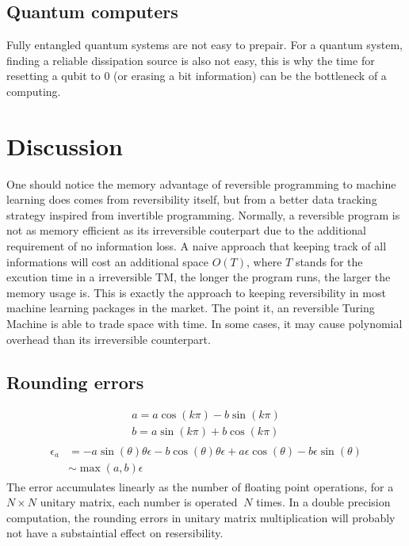 \documentclass{article}
\newcommand{\<}{\langle}
\renewcommand{\>}{\rangle}
\begin{document}
\subsection{Quantum computers}
Fully entangled quantum systems are not easy to prepair.
For a quantum system, finding a reliable dissipation source is also not easy,
this is why the time for resetting a qubit to $0$ (or erasing a bit information) can be the bottleneck of a computing.

\section{Discussion}
One should notice the memory advantage of reversible programming to machine learning does comes from reversibility itself, but from a better data tracking strategy inspired from invertible programming.
Normally, a reversible program is not as memory efficient as its irreversible couterpart due to the additional requirement of no information loss. A naive approach that keeping track of all informations will cost an additional space $O(T)$, where $T$ stands for the excution time in a irreversible TM, the longer the program runs, the larger the memory usage is. This is exactly the approach to keeping reversibility in most machine learning packages in the market.
The point it, an reversible Turing Machine is able to trade space with time.
In some cases, it may cause polynomial overhead than its irreversible counterpart.

\subsection{Rounding errors}
\begin{align}
    a = a\cos(k\pi) - b\sin(k\pi)\\
    b = a\sin(k\pi) + b\cos(k\pi)
\end{align}
\begin{align}
    \begin{split}
    \epsilon_a &= -a\sin(\theta)\theta\epsilon - b\cos(\theta)\theta\epsilon + a\epsilon\cos(\theta) - b\epsilon\sin(\theta)\\
            &\sim \max(a ,b)\epsilon
    \end{split}
\end{align}
The error accumulates linearly as the number of floating point operations, for a $N\times N$ unitary matrix, each number is operated $~N$ times.
In a double precision computation, the rounding errors in unitary matrix multiplication will probably not have a substaintial effect on resersibility.
\end{document}
